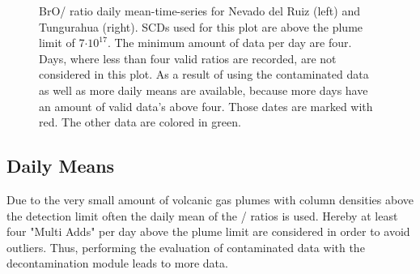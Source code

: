\documentclass  [
  paper    = a4,
  BCOR     = 10mm,
  twoside,
  fontsize = 12pt,
  fleqn,
  toc      = bibnumbered,
  toc      = listofnumbered,
  numbers  = noendperiod,
  headings = normal,
  listof   = leveldown,
  version  = 3.03
]                                       {scrreprt}
\begin{document}
\begin{figure}
	\caption[BrO/ ratio daily mean time series for Nevado del Ruiz (left) and Tungurahua (right).]{
		BrO/ ratio daily mean-time-series for Nevado del Ruiz (left) and Tungurahua (right).  SCDs used for this plot are above the plume limit of 7$\cdot 10^{17}$. The minimum amount of data per day are four. Days, where less than four valid ratios are recorded, are not considered in this plot. As a result of using the contaminated data as well as more daily means are available, because more days have an amount of valid data's above four. Those dates are marked with red. The other data are colored in green.}
	\label{fig:dailymeanstungurahua}
\end{figure}
\subsection*{Daily Means}

Due to the very small amount of volcanic gas plumes with 
  column densities above the detection limit often the daily mean of the /  ratios is used. Hereby at least four "Multi Adds" per day above the plume limit are considered in order to avoid outliers. Thus, performing the evaluation of contaminated data with the decontamination module leads to more data.\\
\end{document}
